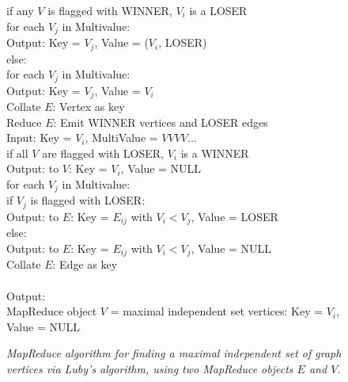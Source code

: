 \begin{figure}[htb]
\begin{center}
{\begin{minipage}{\textwidth}
\begin{tabbing}
       \> \> if any $V$ is flagged with WINNER, $V_i$ is a LOSER \\
       \> \> \> for each $V_j$ in Multivalue: \\
       \> \> \> \> Output: Key = $V_j$, Value = ($V_i$, LOSER) \\
       \> \> else: \\
       \> \> \> for each $V_j$ in Multivalue: \\
       \> \> \> \> Output: Key = $V_j$, Value = $V_i$ \\
 Collate $E$: Vertex as key \\
 Reduce $E$: Emit WINNER vertices and LOSER edges \\
       \> \> Input: Key = $V_i$, MultiValue = $V V V V ...$ \\
       \> \> if all $V$ are flagged with LOSER, $V_i$ is a WINNER \\
       \> \> \> Output: to $V$: Key = $V_i$, Value = NULL \\
       \> \> for each $V_j$ in Multivalue: \\
       \> \> \> if $V_j$ is flagged with LOSER: \\
       \> \> \> \> Output: to $E$: Key = $E_{ij}$ with $V_i < V_j$, Value = LOSER \\
       \> \> \> else: \\
       \> \> \> \> Output: to $E$: Key = $E_{ij}$ with $V_i < V_j$, Value = NULL \\
 Collate $E$: Edge as key \\
\\
Output: \\
\> MapReduce object $V$ = maximal independent set vertices: Key = $V_i$, Value = NULL \\

  \end{tabbing}
 \end{minipage}}\end{center}

 \caption{\it MapReduce algorithm for finding a maximal independent
 set of graph vertices via Luby's algorithm, using two MapReduce
 objects $E$ and $V$.}

 \label{fig:luby}
\end{figure}

